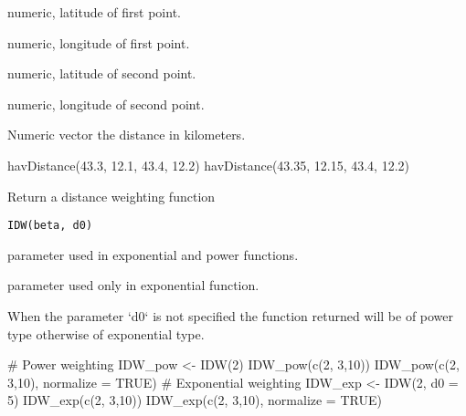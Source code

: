 \documentclass[a4paper]{book}
\begin{document}
%
\begin{Arguments}
\begin{ldescription}
\item[\code{lat\_1}] numeric, latitude of first point.

\item[\code{lon\_1}] numeric, longitude of first point.

\item[\code{lat\_2}] numeric, latitude of second point.

\item[\code{lon\_2}] numeric, longitude of second point.
\end{ldescription}
\end{Arguments}
%
\begin{Value}
Numeric vector the distance in kilometers.
\end{Value}
%
\begin{Examples}
\begin{ExampleCode}
havDistance(43.3, 12.1, 43.4, 12.2)
havDistance(43.35, 12.15, 43.4, 12.2)
\end{ExampleCode}
\end{Examples}
%
\begin{Description}\relax
Return a distance weighting function
\end{Description}
%
\begin{Usage}
\begin{verbatim}
IDW(beta, d0)
\end{verbatim}
\end{Usage}
%
\begin{Arguments}
\begin{ldescription}
\item[\code{beta}] parameter used in exponential and power functions.

\item[\code{d0}] parameter used only in exponential function.
\end{ldescription}
\end{Arguments}
%
\begin{Details}\relax
When the parameter `d0` is not specified the function returned will be of power type otherwise of exponential type.
\end{Details}
%
\begin{Examples}
\begin{ExampleCode}
# Power weighting
IDW_pow <- IDW(2)
IDW_pow(c(2, 3,10))
IDW_pow(c(2, 3,10), normalize = TRUE)
# Exponential weighting
IDW_exp <- IDW(2, d0 = 5)
IDW_exp(c(2, 3,10))
IDW_exp(c(2, 3,10), normalize = TRUE)
\end{ExampleCode}
\end{Examples}
\end{document}
